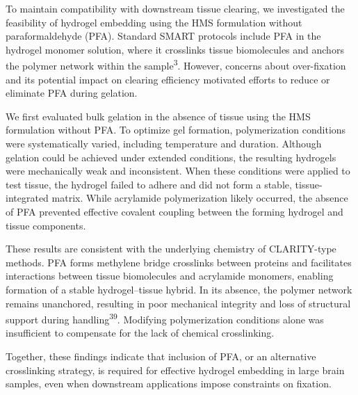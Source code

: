 \documentclass{article}
\begin{document}
To maintain compatibility with downstream tissue clearing, we investigated the feasibility of hydrogel embedding using the HMS formulation without paraformaldehyde (PFA). Standard SMART protocols include PFA in the hydrogel monomer solution, where it crosslinks tissue biomolecules and anchors the polymer network within the sample\textsuperscript{3}. However, concerns about over-fixation and its potential impact on clearing efficiency motivated efforts to reduce or eliminate PFA during gelation.

We first evaluated bulk gelation in the absence of tissue using the HMS formulation without PFA. To optimize gel formation, polymerization conditions were systematically varied, including temperature and duration. Although gelation could be achieved under extended conditions, the resulting hydrogels were mechanically weak and inconsistent. When these conditions were applied to test tissue, the hydrogel failed to adhere and did not form a stable, tissue-integrated  matrix. While acrylamide polymerization likely occurred, the absence of PFA prevented effective covalent coupling between the forming hydrogel and tissue components.

These results are consistent with the underlying chemistry of CLARITY-type methods. PFA forms methylene bridge crosslinks between proteins and facilitates interactions between tissue biomolecules and acrylamide monomers, enabling formation of a stable hydrogel–tissue hybrid. In its absence, the polymer network remains unanchored, resulting in poor mechanical integrity and loss of structural support during handling\textsuperscript{39}. Modifying polymerization conditions alone was insufficient to compensate for the lack of chemical crosslinking.

Together, these findings indicate that inclusion of PFA, or an alternative crosslinking strategy, is required for effective hydrogel embedding in large brain samples, even when downstream applications impose constraints on fixation.
\end{document}
